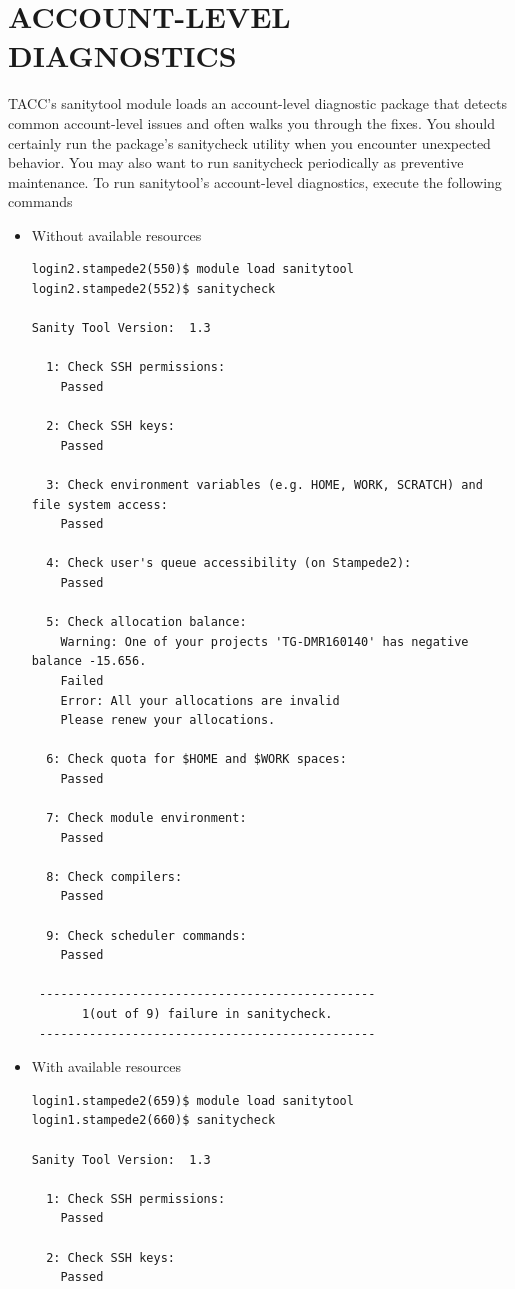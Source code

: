 \documentclass{article}
\begin{document}
\section{ACCOUNT-LEVEL DIAGNOSTICS}
TACC's sanitytool module loads an account-level diagnostic package that detects common account-level issues and often walks you through the fixes.
You should certainly run the package's sanitycheck utility when you encounter unexpected behavior. You may also want to run sanitycheck periodically as preventive maintenance. 
To run sanitytool's account-level diagnostics, execute the following commands\cite{TACC_Stampede2}
\begin{itemize}
 \item Without available resources
\scriptsize
\begin{verbatim}
login2.stampede2(550)$ module load sanitytool
login2.stampede2(552)$ sanitycheck

Sanity Tool Version:  1.3

  1: Check SSH permissions:
	Passed

  2: Check SSH keys:
	Passed

  3: Check environment variables (e.g. HOME, WORK, SCRATCH) and file system access:
	Passed

  4: Check user's queue accessibility (on Stampede2):
	Passed

  5: Check allocation balance:
	Warning: One of your projects 'TG-DMR160140' has negative balance -15.656.
	Failed
	Error: All your allocations are invalid
	Please renew your allocations.

  6: Check quota for $HOME and $WORK spaces:
	Passed

  7: Check module environment:
	Passed

  8: Check compilers:
	Passed

  9: Check scheduler commands:
	Passed

 -----------------------------------------------
       1(out of 9) failure in sanitycheck.
 -----------------------------------------------
\end{verbatim}
\normalsize
\item With available resources
\scriptsize
\begin{verbatim} 
login1.stampede2(659)$ module load sanitytool
login1.stampede2(660)$ sanitycheck

Sanity Tool Version:  1.3

  1: Check SSH permissions:
	Passed

  2: Check SSH keys:
	Passed


\end{verbatim}
\end{itemize}
\end{document}
